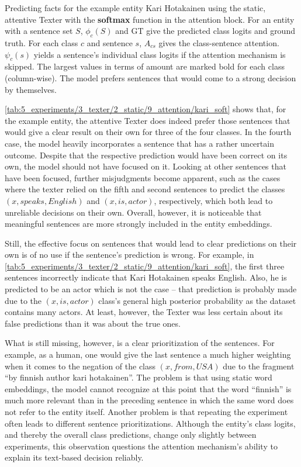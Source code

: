 \begin{table}[t]
    \centering
    
    \caption{Predicting facts for the example entity Kari Hotakainen using the static, attentive Texter with the \textbf{softmax} function in the attention block. For an entity with a sentence set $S$, $\phi_c(S)$ and GT give the predicted class logits and ground truth. For each class $c$ and sentence $s$, $A_{cs}$ gives the class-sentence attention. $\psi_c(s)$ yields a sentence's individual class logits if the attention mechanism is skipped. The largest values in terms of amount are marked bold for each class (column-wise). The model prefers sentences that would come to a strong decision by themselves.}
    \label{tab:5_experiments/3_texter/2_static/9_attention/kari_soft}
\end{table}

\autoref{tab:5_experiments/3_texter/2_static/9_attention/kari_soft} shows that, for the example entity, the attentive Texter does indeed prefer those sentences that would give a clear result on their own for three of the four classes. In the fourth case, the model heavily incorporates a sentence that has a rather uncertain outcome. Despite that the respective prediction would have been correct on its own, the model should not have focused on it. Looking at other sentences that have been focused, further misjudgments become apparent, such as the cases where the texter relied on the fifth and second sentences to predict the classes $(x, speaks, English)$ and $(x, is, actor)$, respectively, which both lead to unreliable decisions on their own. Overall, however, it is noticeable that meaningful sentences are more strongly included in the entity embeddings.

Still, the effective focus on sentences that would lead to clear predictions on their own is of no use if the sentence's prediction is wrong. For example, in \autoref{tab:5_experiments/3_texter/2_static/9_attention/kari_soft}, the first three sentences incorrectly indicate that Kari Hotakainen speaks English. Also, he is predicted to be an actor which is not the case -- that prediction is probably made due to the $(x, is, actor)$ class's general high posterior probability as the dataset contains many actors. At least, however, the Texter was less certain about its false predictions than it was about the true ones.

What is still missing, however, is a clear prioritization of the sentences. For example, as a human, one would give the last sentence a much higher weighting when it comes to the negation of the class $(x, from, USA)$ due to the fragment ``by finnish author kari hotakainen''. The problem is that using static word embeddings, the model cannot recognize at this point that the word ``finnish'' is much more relevant than in the preceding sentence in which the same word does not refer to the entity itself. Another problem is that repeating the experiment often leads to different sentence prioritizations. Although the entity's class logits, and thereby the overall class predictions, change only slightly between experiments, this observation questions the attention mechanism's ability to explain its text-based decision reliably.

